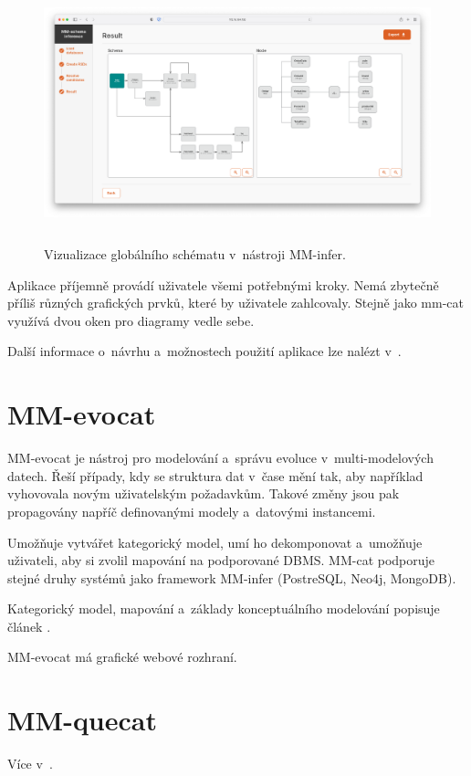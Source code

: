 \begin{figure}[htb]
  \centering
  \includegraphics[height=75mm]{../img/mm-infer-result}
  \caption{Vizualizace globálního schématu v~nástroji MM-infer.}
  \label{obr01:mm-infer-result}
\end{figure}

Aplikace příjemně provádí uživatele všemi potřebnými kroky. Nemá zbytečně příliš různých grafických prvků, které by uživatele zahlcovaly. Stejně jako mm-cat využívá dvou oken pro diagramy vedle sebe.

Další informace o~návrhu a~možnostech použití aplikace lze nalézt v~\cite{MM_infer}.

\section{MM-evocat}

MM-evocat je nástroj pro modelování a~správu evoluce v~multi-modelových datech. Řeší případy, kdy se struktura dat v~čase mění tak, aby například vyhovovala novým uživatelským požadavkům. Takové změny jsou pak propagovány napříč definovanými modely a~datovými instancemi.

Umožňuje vytvářet kategorický model, umí ho dekomponovat a~umožňuje uživateli, aby si zvolil mapování na podporované DBMS. MM-cat podporuje stejné druhy systémů jako framework MM-infer (PostreSQL, Neo4j, MongoDB).

Kategorický model, mapování a~základy konceptuálního modelování popisuje článek \cite{MM_evocat}.

MM-evocat má grafické webové rozhraní.


\section{MM-quecat}

Více v~\cite{MM_quecat}.



